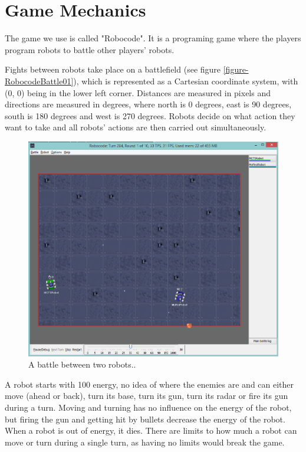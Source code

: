 \section{Game Mechanics}
\label{03}

The game we use is called "Robocode"\cite{robocode}. It is a programing game where the players program robots to battle other players' robots. 

Fights between robots take place on a battlefield (see figure \ref{figure-RobocodeBattle01}), which is represented as a Cartesian coordinate system, with (0, 0) being in the lower left corner. Distances are measured in pixels and directions are measured in degrees, where north is 0 degrees, east is 90 degrees, south is 180 degrees and west is 270 degrees. Robots decide on what action they want to take and all robots' actions are then carried out simultaneously.

\begin{figure}[htp]
\centerline{\includegraphics[width=\columnwidth]{Images/RobocodeBattle01}}
\caption{A battle between two robots..}
\label{figure--RobocodeBattle01}
\end{figure}

A robot starts with 100 energy, no idea of where the enemies are and can either move (ahead or back), turn its base, turn its gun, turn its radar or fire its gun during a turn. Moving and turning has no influence on the energy of the robot, but firing the gun and getting hit by bullets decrease the energy of the robot. When a robot is out of energy, it dies. There are limits to how much a robot can move or turn during a single turn\cite{wiki:robocodeGamePhysics}, as having no limits would break the game.

